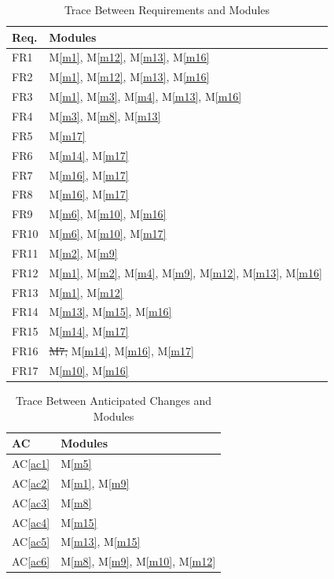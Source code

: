 \documentclass[12pt, titlepage]{article}
\newcommand{\acref}[1]{AC\ref{#1}}
\newcommand{\mref}[1]{M\ref{#1}}
\begin{document}
\begin{table}[H]
\centering
\begin{tabular}{p{} p{}}
\toprule
\textbf{Req.} & \textbf{Modules}\\
\midrule
FR1 & \mref{m1}, \mref{m12}, \mref{m13}, \mref{m16}\\
FR2 & \mref{m1}, \mref{m12}, \mref{m13}, \mref{m16}\\
FR3 & \mref{m1}, \mref{m3}, \mref{m4}, \mref{m13}, \mref{m16}\\
FR4 & \mref{m3}, \mref{m8}, \mref{m13}\\
FR5 & \mref{m17}\\
FR6 & \mref{m14}, \mref{m17}\\
FR7 & \mref{m16}, \mref{m17}\\
FR8 & \mref{m16}, \mref{m17}\\
FR9 & \mref{m6}, \mref{m10}, \mref{m16}\\
FR10 & \mref{m6}, \mref{m10}, \mref{m17}\\
FR11 & \mref{m2}, \mref{m9}\\
FR12 & \mref{m1}, \mref{m2}, \mref{m4}, \mref{m9}, \mref{m12}, \mref{m13}, \mref{m16}\\
FR13 & \mref{m1}, \mref{m12}\\
FR14 & \mref{m13}, \mref{m15}, \mref{m16}\\
FR15 & \mref{m14}, \mref{m17}\\
FR16 & \sout{M7,} \mref{m14}, \mref{m16}, \mref{m17}\\
FR17 & \mref{m10}, \mref{m16}\\
\bottomrule
\end{tabular}
\caption{Trace Between Requirements and Modules}
\label{TblRT}
\end{table}

\begin{table}[H]
\centering
\begin{tabular}{p{} p{}}
\toprule
\textbf{AC} & \textbf{Modules}\\
\midrule
\acref{ac1} & \mref{m5}\\
\acref{ac2} & \mref{m1}, \mref{m9}\\
\acref{ac3} & \mref{m8}\\
\acref{ac4} & \mref{m15}\\
\acref{ac5} & \mref{m13}, \mref{m15}\\
\acref{ac6} & \mref{m8}, \mref{m9}, \mref{m10}, \mref{m12}\\
\bottomrule
\end{tabular}
\caption{Trace Between Anticipated Changes and Modules}
\label{TblACT}
\end{table}
\end{document}
